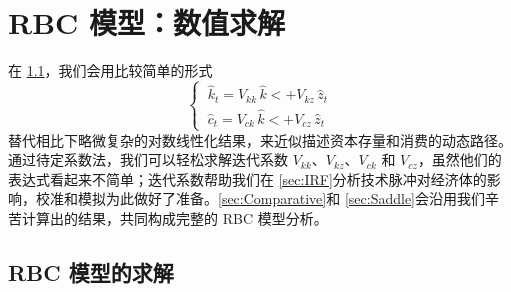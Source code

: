 

\ChapterGeometry

\chapter{RBC 模型：数值求解}\label{ch:04}


在 \ref{sec:SolveRBC}，我们会用比较简单的形式
\begin{equation}
    \begin{cases}
        \ \hat k_t=V_{kk}\,\hat k\lt+V_{kz}\,\hat z_t\\
        \ \hat c_t=V_{ck}\,\hat k\lt+V_{cz}\,\hat z_t
    \end{cases}
\end{equation}
替代相比下略微复杂的对数线性化结果，来近似描述资本存量和消费的动态路径。通过待定系数法，我们可以轻松求解迭代系数 \(V_{kk}\)、\(V_{kz}\)、\(V_{ck}\) 和 \(V_{cz}\)，虽然他们的表达式看起来不简单；迭代系数帮助我们在 \ref{sec:IRF}分析技术脉冲对经济体的影响，校准和模拟为此做好了准备。\ref{sec:Comparative}和 \ref{sec:Saddle}会沿用我们辛苦计算出的结果，共同构成完整的 RBC 模型分析。


\section{RBC 模型的求解}\label{sec:SolveRBC}

